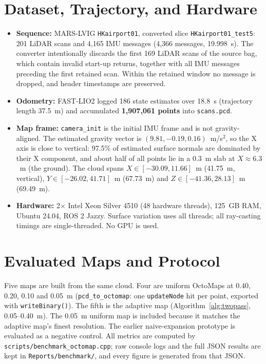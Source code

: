 \documentclass[11pt,a4paper]{report}
\begin{document}
\section{Dataset, Trajectory, and Hardware}
\begin{itemize}
    \item \textbf{Sequence:} MARS-LVIG \texttt{HKairport01}, converted slice \texttt{HKairport01\_test5}: 201 LiDAR scans and 4,165 IMU messages (4,366 messages, 19.998~s). The converter intentionally discards the first 169 LiDAR scans of the source bag, which contain invalid start-up returns, together with all IMU messages preceding the first retained scan. Within the retained window no message is dropped, and header timestamps are preserved.
    \item \textbf{Odometry:} FAST-LIO2 logged 186 state estimates over 18.8~s (trajectory length 37.5~m) and accumulated \textbf{1,907,061 points} into \texttt{scans.pcd}.
    \item \textbf{Map frame:} \texttt{camera\_init} is the initial IMU frame and is not gravity-aligned. The estimated gravity vector is $(9.81, -0.19, 0.16)$~m/s$^2$, so the X axis is close to vertical: 97.5\% of estimated surface normals are dominated by their X component, and about half of all points lie in a 0.3~m slab at $X \approx 6.3$~m (the ground). The cloud spans $X \in [-30.09, 11.66]$~m (41.75~m, vertical), $Y \in [-26.02, 41.71]$~m (67.73~m) and $Z \in [-41.36, 28.13]$~m (69.49~m).
    \item \textbf{Hardware:} 2$\times$ Intel Xeon Silver 4510 (48 hardware threads), 125~GB RAM, Ubuntu 24.04, ROS 2 Jazzy. Surface variation uses all threads; all ray-casting timings are single-threaded. No GPU is used.
\end{itemize}

\section{Evaluated Maps and Protocol}
Five maps are built from the same cloud. Four are uniform OctoMaps at 0.40, 0.20, 0.10 and 0.05~m (\texttt{pcd\_to\_octomap}: one \texttt{updateNode} hit per point, exported with \texttt{writeBinary()}). The fifth is the adaptive map (Algorithm~\ref{alg:twopass}, 0.05--0.40~m). The 0.05~m uniform map is included because it matches the adaptive map's finest resolution. The earlier naive-expansion prototype is evaluated as a negative control. All metrics are computed by \texttt{scripts/benchmark\_octomap.cpp}; raw console logs and the full JSON results are kept in \texttt{Reports/benchmark/}, and every figure is generated from that JSON.
\end{document}
